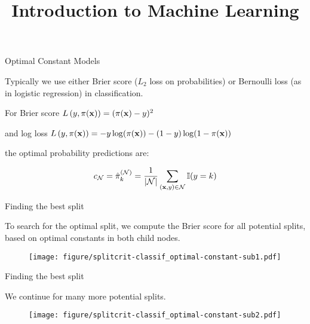 \documentclass[11pt,compress,t,notes=noshow, xcolor=table]{beamer}
\title{Introduction to Machine Learning}
\institute{\href{https://compstat-lmu.github.io/lecture_i2ml/}{compstat-lmu.github.io/lecture\_i2ml}}
\date{}
\begin{document}
\sloppy

\begin{vbframe}{Optimal Constant Models}

Typically we use either Brier score ($L_2$ loss on probabilities) or  Bernoulli loss (as in logistic regression) in classification.

\vspace{0.5cm}
For Brier score $L\left(y, \pi(\mathbf{x})\right) = (\pi(\mathbf{x}) - y)^2$
\vspace{0.5cm}

and log loss $L\left(y, \pi(\mathbf{x})\right) = -y\log(\pi(\mathbf{x}))-(1-y)\log(1-\pi(\mathbf{x}))$
\vspace{0.5cm}

the optimal probability predictions are:

$$c_{\mathcal{N}} = \hat\pi_k^{(\mathcal{N})} = \frac{1}{|\mathcal{N}|} \sum\limits_{(\mathbf{x},y) \in \mathcal{N}} \mathbb{I}(y = k)$$ 



\end{vbframe}


\begin{frame}[b]{Finding the best split}

To search for the optimal split, we compute the Brier score for all potential splits, based on optimal constants in both child nodes.

\vspace{0.5cm}

\begin{figure}[b]
    \centering
  \texttt{[image: figure/splitcrit-classif\_optimal-constant-sub1.pdf]}
\end{figure}


\end{frame}

\begin{frame}[noframenumbering]{Finding the best split}

We continue for many more potential splits.

\vspace{0.8cm}

\begin{figure}[b]
    \centering
  \texttt{[image: figure/splitcrit-classif\_optimal-constant-sub2.pdf]}
\end{figure}


\end{frame}
\end{document}
